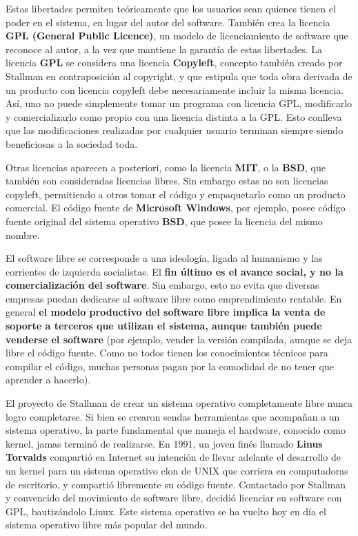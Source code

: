 Estas libertades permiten teóricamente que los usuarios sean quienes tienen el
poder en el sistema, en lugar del autor del software. También crea la licencia
\textbf{GPL (General Public Licence)}, un modelo de licenciamiento de software
que reconoce al autor, a la vez que mantiene la garantía de estas libertades.
La licencia \textbf{GPL} se considera una licencia \textbf{Copyleft}, concepto
también creado por Stallman en contraposición al copyright, y que estipula que
toda obra derivada de un producto con licencia copyleft debe necesariamente
incluir la misma licencia. Así, uno no puede simplemente tomar un programa con
licencia GPL, modificarlo y comercializarlo como propio con una licencia distinta
a la GPL. Esto conlleva que las modificaciones realizadas por cualquier usuario
terminan siempre siendo beneficiosas a la sociedad toda.

Otras licencias aparecen a posteriori, como la licencia \textbf{MIT}, o la
\textbf{BSD}, que también son consideradas licencias libres. Sin embargo estas
no son licencias copyleft, permitiendo a otros tomar el código y empaquetarlo
como un producto comercial. El código fuente de \textbf{Microsoft Windows},
por ejemplo, posee código fuente original del sistema operativo \textbf{BSD},
que posee la licencia del mismo nombre.

El software libre se corresponde a una ideología, ligada al humanismo y las
corrientes de izquierda socialistas. El \textbf{fin último es el avance social, y no
la comercialización del software}. Sin embargo, esto no evita que diversas
empresas puedan dedicarse al software libre como emprendimiento rentable. En
general \textbf{el modelo productivo del software libre implica la venta de soporte
a terceros que utilizan el sistema, aunque también puede venderse el software}
(por ejemplo, vender la versión compilada, aunque se deja libre el código fuente.
Como no todos tienen los conocimientos técnicos para compilar el código, muchas
personas pagan por la comodidad de no tener que aprender a hacerlo).

El proyecto de Stallman de crear un sistema operativo completamente libre nunca
logro completarse. Si bien se crearon sendas herramientas que acompañan a un
sistema operativo, la parte fundamental que maneja el hardware, conocido como
kernel, jamas terminó de realizarse. En 1991, un joven finés llamado \textbf{Linus
Torvalds} compartió en Internet su intención de llevar adelante el desarrollo de
un kernel para un sistema operativo clon de UNIX que corriera en computadoras de
escritorio, y compartió libremente su código fuente. Contactado por Stallman
y convencido del movimiento de software libre, decidió licenciar su software con
GPL, bautizándolo Linux. Este sistema operativo se ha vuelto hoy en día el
sistema operativo libre más popular del mundo.

